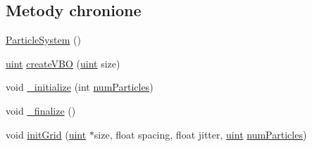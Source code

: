 \subsection*{Metody chronione}
\begin{DoxyCompactItemize}
\item 
\hyperlink{class_particle_system_a9028ec8023c61773dd4a668c3ad8cc26}{Particle\-System} ()
\item 
\hyperlink{particles__kernel_8cuh_a91ad9478d81a7aaf2593e8d9c3d06a14}{uint} \hyperlink{class_particle_system_a399eb5cb9c422fd3370899e4d8a5d62e}{create\-V\-B\-O} (\hyperlink{particles__kernel_8cuh_a91ad9478d81a7aaf2593e8d9c3d06a14}{uint} size)
\item 
void \hyperlink{class_particle_system_a484988642e046424d32a13709204e8de}{\-\_\-initialize} (int \hyperlink{particles_8cpp_a05b8a90212054a3eb1a036ae0c269596}{num\-Particles})
\item 
void \hyperlink{class_particle_system_a5d6a52db7d1277c8fe734ecceb69e5c6}{\-\_\-finalize} ()
\item 
void \hyperlink{class_particle_system_a2e08c4e354b0de5e2dc468a0fb457dfe}{init\-Grid} (\hyperlink{particles__kernel_8cuh_a91ad9478d81a7aaf2593e8d9c3d06a14}{uint} $\ast$size, float spacing, float jitter, \hyperlink{particles__kernel_8cuh_a91ad9478d81a7aaf2593e8d9c3d06a14}{uint} \hyperlink{particles_8cpp_a05b8a90212054a3eb1a036ae0c269596}{num\-Particles})
\end{DoxyCompactItemize}
